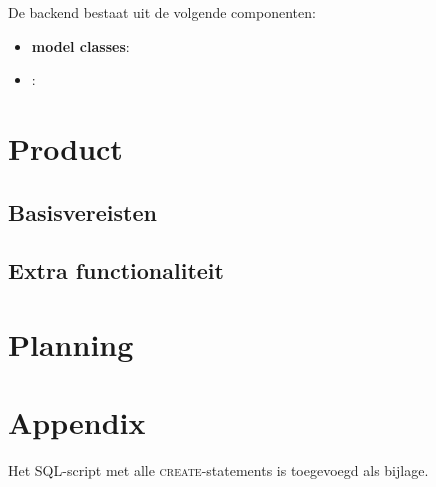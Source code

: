 \documentclass[12pt,a4paper]{article}
\begin{document}
De backend bestaat uit de volgende componenten:

\begin{itemize}

\item \textbf{model classes}:  

\item \textbf{}:

\end{itemize}

\section{Product}

\subsection{Basisvereisten}

\subsection{Extra functionaliteit}

\section{Planning}

\section{Appendix}
Het SQL-script met alle \textsc{create}-statements is toegevoegd als bijlage.
\end{document}
